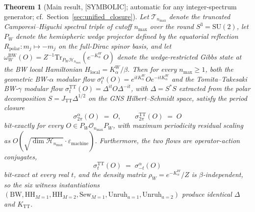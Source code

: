 \documentclass[11pt,a4paper]{article}
\theoremstyle{plain}
\newtheorem{theorem}{Theorem}[section]
\theoremstyle{definition}
\newcommand{\nmax}{n_{\max}}
\newcommand{\sthree}{S^{3}}
\newcommand{\Hilb}{\mathcal{H}}
\newcommand{\Op}{\mathcal{O}}
\newcommand{\Tcal}{\mathcal{T}}
\newcommand{\SU}{\mathrm{SU}}
\newcommand{\Tr}{\mathrm{Tr}}
\newcommand{\TT}{\mathrm{TT}}
\newcommand{\BW}{\mathrm{BW}}
\newcommand{\HH}{\mathrm{HH}}
\newcommand{\Sew}{\mathrm{Sew}}
\newcommand{\Unruh}{\mathrm{Unruh}}
\begin{document}
\begin{theorem}[Main result, {[SYMBOLIC]}; automatic for any
integer-spectrum generator; cf.~Section~\ref{sec:unified_closure}]
\label{thm:main_intro}
Let $\Tcal_{\nmax}$ denote the truncated Camporesi--Higuchi spectral
triple of cutoff $\nmax$ over the round $\sthree = \SU(2)$, let
$P_W$ denote the hemispheric wedge projector defined by the equatorial
reflection $R_{\mathrm{polar}}: m_j \mapsto -m_j$ on the full-Dirac
spinor basis, and let
$\omega_W^{\BW}(O) = Z^{-1} \Tr_{P_W \Hilb_{\nmax}}(e^{-K_\alpha^W}\,O)$
denote the wedge-restricted Gibbs state at the BW local Hamiltonian
$H_{\mathrm{local}} = K_\alpha^W / \beta$. Then for every $\nmax \ge
1$, both the geometric BW-$\alpha$ modular flow
$\sigma_t^{\alpha}(O) = e^{itK_\alpha^W} O e^{-itK_\alpha^W}$ and the
Tomita--Takesaki BW-$\gamma$ modular flow $\sigma_t^{\TT}(O) =
\Delta^{it} O \Delta^{-it}$, with $\Delta = S^* S$ extracted from the
polar decomposition $S = J_{\TT} \Delta^{1/2}$ on the GNS Hilbert--Schmidt
space, satisfy the period closure
\begin{equation}\label{eq:period_closure_main}
   \sigma_{2\pi}^{\alpha}(O) \;=\; O,\qquad
   \sigma_{2\pi}^{\TT}(O) \;=\; O
\end{equation}
bit-exactly for every $O \in P_W \Op_{\nmax} P_W$, with maximum
periodicity residual scaling as
$O(\sqrt{\dim \Hilb_{\nmax}} \cdot \varepsilon_{\mathrm{machine}})$.
Furthermore, the two flows are operator-action conjugates,
\begin{equation}\label{eq:tt_alpha_conjugate_main}
   \sigma_t^{\TT}(O) \;=\; \sigma_{-t}^{\alpha}(O)
\end{equation}
bit-exact at every real $t$, and the density matrix
$\rho_W = e^{-K_\alpha^W}/Z$ is $\beta$-independent, so the six
witness instantiations $(\BW, \HH_{M=1}, \HH_{M=2},
\Sew_{M=1}, \Unruh_{a=1}, \Unruh_{a=2})$ produce identical
$\Delta$ and $K_{\TT}$.
\end{theorem}
\end{document}
